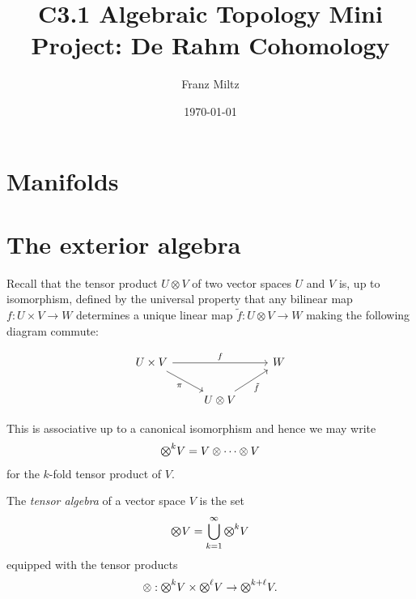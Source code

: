 \documentclass{article}
\begin{document}
\title{C3.1 Algebraic Topology Mini Project: De Rahm Cohomology}
\author{Franz Miltz}
\date{\today}
\maketitle
\tableofcontents

\section{Manifolds}


\section{The exterior algebra}

Recall that the tensor product $U\otimes V$ of two vector spaces $U$ and $V$ is, up to isomorphism, defined by the universal property that any bilinear map $f:U\times V\to W$ determines a unique linear map $\tilde f : U\otimes V\to W$ making the following diagram commute:

\begin{equation*}
  \begin{tikzcd}
    {U\times V} && W \\
                & {U\otimes V}
                \arrow["f", from=1-1, to=1-3]
                \arrow["{\tilde f}"', from=2-2, to=1-3]
                \arrow["\pi"', from=1-1, to=2-2]
  \end{tikzcd}
\end{equation*}

This is associative up to a canonical isomorphism and hence we may write
\begin{align*}
  \tensor{k}{V} = V \otimes \cdots \otimes V
\end{align*}
for the $k$-fold tensor product of $V$.

\begin{definition}
  The \emph{tensor algebra} of a vector space $V$ is the set
  \begin{align*}
    \tensor{}{V} = \bigcup_{k=1}^\infty \tensor{k}{V}
  \end{align*}
  equipped with the tensor products
  \begin{align*}
    \otimes : \tensor{k}{V} \times \tensor{\ell}{V}\to \tensor{k+\ell} V.
  \end{align*}
\end{definition}
\end{document}
